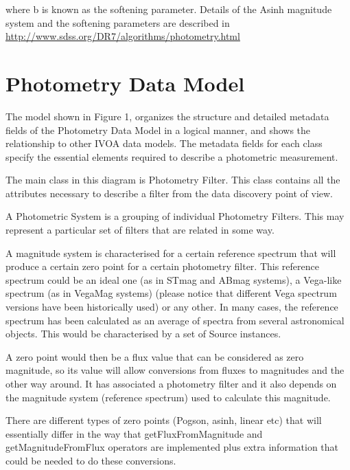 \documentclass[11pt,a4paper]{ivoa}
\begin{document}
where b is known as the softening parameter. Details of the Asinh magnitude
system and the softening parameters are described in
\url{http://www.sdss.org/DR7/algorithms/photometry.html}
\par

\section{Photometry Data Model} \label{datamodel}
The model shown in Figure 1, organizes the structure and detailed metadata
fields of the Photometry Data Model in a logical manner, and shows the
relationship to other IVOA data models. The metadata fields for each class
specify the essential elements required to describe a photometric measurement.
\par

The main class in this diagram is Photometry Filter. This class contains
all the attributes necessary to describe a filter from the data discovery
point of view.
\par

A Photometric System is a grouping of individual Photometry Filters. This may
represent a particular set of filters that are related in some way.
\par

A magnitude system is characterised for a certain reference spectrum that
will produce a certain zero point for a certain photometry filter. This
reference spectrum could be an ideal one (as in STmag and ABmag systems), a
Vega-like spectrum (as in VegaMag systems) (please notice that different Vega
spectrum versions have been historically used) or any other. In many cases,
the reference spectrum has been calculated as an average of spectra from several
astronomical objects. This would be characterised by a set of Source instances.
\par

A zero point would then be a flux value that can be considered as zero
magnitude, so its value will allow conversions from fluxes to magnitudes
and the other way around. It has associated a photometry filter and it also
depends on the magnitude system (reference spectrum) used to calculate this
magnitude.
\par

There are different types of zero points (Pogson, asinh, linear etc) that will
essentially differ in the way that getFluxFromMagnitude and getMagnitudeFromFlux
operators are implemented plus extra information that could be needed to do
these conversions.
\par
\end{document}
